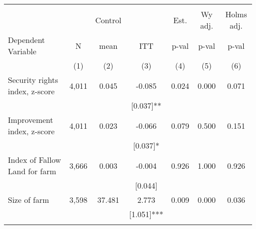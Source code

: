 \begin{tabular}{lcccccc}
\hline \noalign{\smallskip} &  &  &  &  &  & \\
 &  & Control &  & Est. & Wy adj. & Holms adj.\\
Dependent Variable & N & mean & ITT & p-val & p-val & p-val\\
 & (1) & (2) & (3) & (4) & (5) & (6)\\
\noalign{\smallskip}\hline \noalign{\smallskip}Security rights index, z-score & 4,011 & 0.045 & -0.085 & 0.024 & 0.000 & 0.071\\
 &  &  & [0.037]** &  &  & \\
Improvement index, z-score & 4,011 & 0.023 & -0.066 & 0.079 & 0.500 & 0.151\\
 &  &  & [0.037]* &  &  & \\
Index of Fallow Land for farm & 3,666 & 0.003 & -0.004 & 0.926 & 1.000 & 0.926\\
 &  &  & [0.044] &  &  & \\
Size of farm & 3,598 & 37.481 & 2.773 & 0.009 & 0.000 & 0.036\\
 &  &  & [1.051]*** &  &  & \\
\noalign{\smallskip}\hline\end{tabular}
